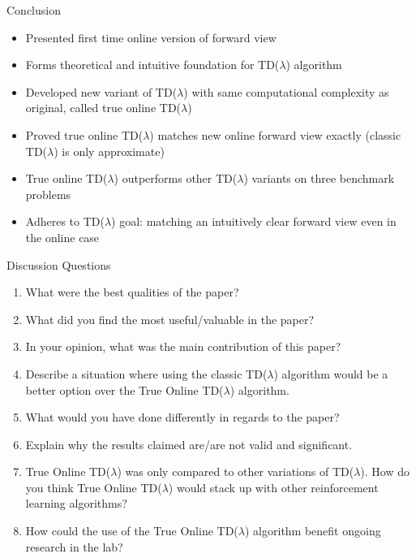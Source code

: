\documentclass[xcolor={table}]{beamer}
\begin{document}
\begin{frame}{Conclusion}
    \begin{itemize}
        \item Presented first time online version of forward view \item Forms theoretical and intuitive foundation for TD($\lambda$) algorithm
        \item Developed new variant of TD($\lambda$) with same computational complexity as original, called true online TD($\lambda$)
        \item Proved true online TD($\lambda$) matches new online forward view exactly (classic TD($\lambda$) is only approximate)
        \item True online TD($\lambda$) outperforms other TD($\lambda$) variants on three benchmark problems
        \item Adheres to TD($\lambda$) goal: matching an intuitively clear forward view even in the online case
    \end{itemize}
\end{frame}

\begin{frame}{Discussion Questions}
    \begin{enumerate}
        \item What were the best qualities of the paper?
        \item What did you find the most useful/valuable in the paper?
        \item In your opinion, what was the main contribution of this paper?
        \item Describe a situation where using the classic TD($\lambda$) algorithm would be a better option over the True Online TD($\lambda$) algorithm.
        \item What would you have done differently in regards to the paper?
        \item Explain why the results claimed are/are not valid and significant.
        \item True Online TD($\lambda$) was only compared to other variations of TD($\lambda$).  How do you think True Online TD($\lambda$) would stack up with other reinforcement learning algorithms?
        \item How could the use of the True Online TD($\lambda$) algorithm benefit ongoing research in the lab?
    \end{enumerate}
\end{frame}
\end{document}
